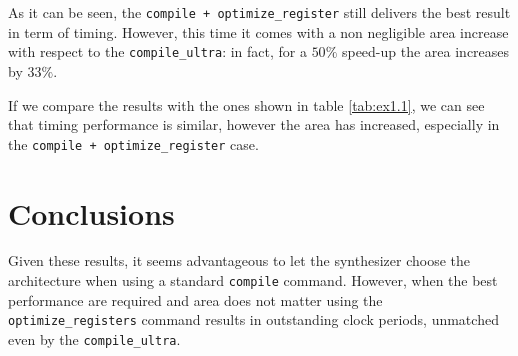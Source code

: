 As it can be seen, the \verb|compile + optimize_register| still delivers the best result in term of timing. However, this time it comes with a non negligible area increase with respect to the \verb|compile_ultra|:
in fact, for a $50\%$ speed-up the area increases by $33\%$.

If we compare the results with the ones shown in table \ref{tab:ex1.1}, we can see that timing performance is similar, however the area has increased, especially in the \verb|compile + optimize_register| case.

\section{Conclusions}

Given these results, it seems advantageous to let the synthesizer choose the architecture when using a standard \verb|compile| command.
However, when the best performance are required and area does not matter using the \verb|optimize_registers| command results in outstanding clock periods, unmatched even by the \verb|compile_ultra|. 